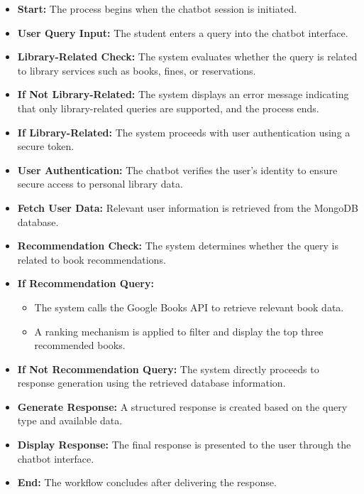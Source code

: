 \documentclass[12pt,a4paper]{report}
\begin{document}
\begin{itemize}
    \item \textbf{Start:} The process begins when the chatbot session is initiated.
    
    \item \textbf{User Query Input:} The student enters a query into the chatbot interface.
        
    \item \textbf{Library-Related Check:} The system evaluates whether the query is related to library services such as books, fines, or reservations.
    
    \item \textbf{If Not Library-Related:} The system displays an error message indicating that only library-related queries are supported, and the process ends.
    
    \item \textbf{If Library-Related:} The system proceeds with user authentication using a secure token.
    
    \item \textbf{User Authentication:} The chatbot verifies the user's identity to ensure secure access to personal library data.
    
    \item \textbf{Fetch User Data:} Relevant user information is retrieved from the MongoDB database.
    
    \item \textbf{Recommendation Check:} The system determines whether the query is related to book recommendations.
    
    \item \textbf{If Recommendation Query:}
    \begin{itemize}
        \item The system calls the Google Books API to retrieve relevant book data.
        \item A ranking mechanism is applied to filter and display the top three recommended books.
    \end{itemize}
    
    \item \textbf{If Not Recommendation Query:} The system directly proceeds to response generation using the retrieved database information.
    
    \item \textbf{Generate Response:} A structured response is created based on the query type and available data.
    
    \item \textbf{Display Response:} The final response is presented to the user through the chatbot interface.
    
    \item \textbf{End:} The workflow concludes after delivering the response.
\end{itemize}
\end{document}
